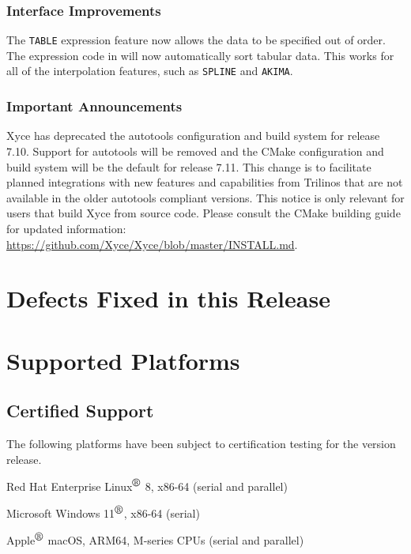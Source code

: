 \documentclass[letterpaper]{scrartcl}
\begin{document}


\subsubsection*{Interface Improvements}
\begin{XyceItemize}
\item The \texttt{TABLE} expression feature now allows the data to be specified out of order.  The expression code in \Xyce{} will now automatically sort tabular data.  This works for all of the interpolation features, such as \texttt{SPLINE} and \texttt{AKIMA}.
\end{XyceItemize}

\subsubsection*{Important Announcements}
\begin{XyceItemize}
  \item Xyce has deprecated the autotools configuration and build system for release 7.10.  
  Support for autotools will be removed and the CMake configuration and build system will be the default for release 7.11.  
  This change is to facilitate planned integrations with new features and capabilities from Trilinos that are not available in the older autotools compliant versions.  
  This notice is only relevant for users that build Xyce from source code.
  Please consult the CMake building guide for updated information: \newline
  {\color{XyceDeepRed}\url{https://github.com/Xyce/Xyce/blob/master/INSTALL.md}}. 
\end{XyceItemize}

\section{Defects Fixed in this Release}


\newpage
\section{Supported Platforms}
\subsection*{Certified Support}
The following platforms have been subject to certification testing for the
\Xyce{} version \XyceVersionVar{} release.
\begin{XyceItemize}
  \item Red Hat Enterprise Linux${}^{\mbox{\textregistered}}$ 8, x86-64 (serial and parallel)
  \item Microsoft Windows 11${}^{\mbox{\textregistered}}$, x86-64 (serial)
  \item Apple${}^{\mbox{\textregistered}}$ macOS, ARM64, M-series CPUs (serial and parallel)
\end{XyceItemize}
\end{document}
